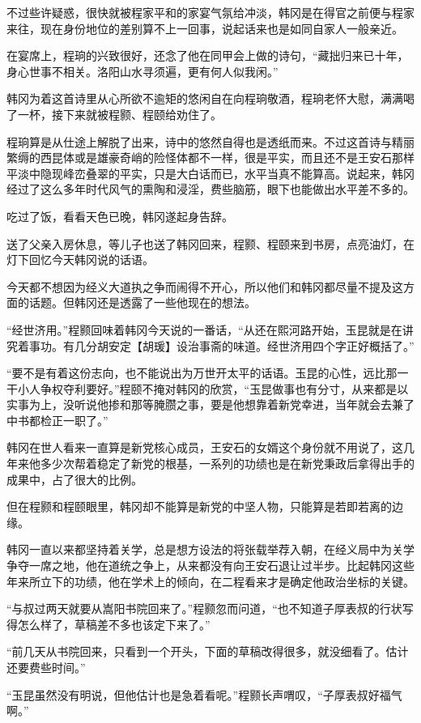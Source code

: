 不过些许疑惑，很快就被程家平和的家宴气氛给冲淡，韩冈是在得官之前便与程家来往，现在身份地位的差别算不上一回事，说起话来也是如同自家人一般亲近。

在宴席上，程珦的兴致很好，还念了他在同甲会上做的诗句，“藏拙归来已十年，身心世事不相关。洛阳山水寻须遍，更有何人似我闲。”

韩冈为着这首诗里从心所欲不逾矩的悠闲自在向程珦敬酒，程珦老怀大慰，满满喝了一杯，接下来就被程颢、程颐给劝住了。

程珦算是从仕途上解脱了出来，诗中的悠然自得也是透纸而来。不过这首诗与精丽繁缛的西昆体或是雄豪奇峭的险怪体都不一样，很是平实，而且还不是王安石那样平淡中隐现峰峦叠翠的平实，只是大白话而已，水平当真不能算高。说起来，韩冈经过了这么多年时代风气的熏陶和浸淫，费些脑筋，眼下也能做出水平差不多的。

吃过了饭，看看天色已晚，韩冈遂起身告辞。

送了父亲入房休息，等儿子也送了韩冈回来，程颢、程颐来到书房，点亮油灯，在灯下回忆今天韩冈说的话语。

今天都不想因为经义大道执之争而闹得不开心，所以他们和韩冈都尽量不提及这方面的话题。但韩冈还是透露了一些他现在的想法。

“经世济用。”程颢回味着韩冈今天说的一番话，“从还在熙河路开始，玉昆就是在讲究着事功。有几分胡安定【胡瑗】设治事斋的味道。经世济用四个字正好概括了。”

“要不是有着这份志向，也不能说出为万世开太平的话语。玉昆的心性，远比那一干小人争权夺利要好。”程颐不掩对韩冈的欣赏，“玉昆做事也有分寸，从来都是以实事为上，没听说他掺和那等腌臜之事，要是他想靠着新党幸进，当年就会去兼了中书都检正一职了。”

韩冈在世人看来一直算是新党核心成员，王安石的女婿这个身份就不用说了，这几年来他多少次帮着稳定了新党的根基，一系列的功绩也是在新党秉政后拿得出手的成果中，占了很大的比例。

但在程颢和程颐眼里，韩冈却不能算是新党的中坚人物，只能算是若即若离的边缘。

韩冈一直以来都坚持着关学，总是想方设法的将张载举荐入朝，在经义局中为关学争夺一席之地，他在道统之争上，从来都没有向王安石退让过半步。比起韩冈这些年来所立下的功绩，他在学术上的倾向，在二程看来才是确定他政治坐标的关键。

“与叔过两天就要从嵩阳书院回来了。”程颢忽而问道，“也不知道子厚表叔的行状写得怎么样了，草稿差不多也该定下来了。”

“前几天从书院回来，只看到一个开头，下面的草稿改得很多，就没细看了。估计还要费些时间。”

“玉昆虽然没有明说，但他估计也是急着看呢。”程颢长声喟叹，“子厚表叔好福气啊。”

